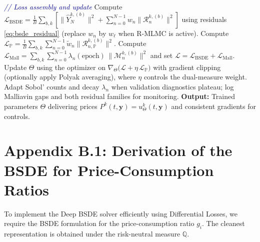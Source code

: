 \documentclass[11pt,letterpaper,oneside]{article}
\numberwithin{equation}{section}
\newcommand{\1}{\mathbf{1}}
\begin{document}
\begin{algorithm}[H]
\begin{algorithmic}[1]
    \State \textcolor{darkblue}{\textit{// Loss assembly and update}}
    \State Compute $\mathcal{L}_{\mathrm{BSDE}} = \frac{1}{B}\sum_{b,k}\left[\|\widehat{Y}_{N}^{k,(b)}\|^2 + \sum_{n=0}^{N-1} w_n \|\mathcal{R}_{n}^{k,(b)}\|^2\right]$ using residuals \eqref{eq:bsde_residual} (replace $w_n$ by $w_\ell$ when R-MLMC is active).
    \State Compute $\mathcal{L}_{\mathbb{P}} = \frac{1}{B}\sum_{b,k}\sum_{n=0}^{N-1} \tilde{w}_n \|\mathcal{R}_{n,\mathbb{P}}^{k,(b)}\|^2$.
    \State Compute $\mathcal{L}_{\mathrm{Mall}} = \sum_{b,k}\sum_{n=0}^{N-1} \lambda_n(\mathrm{epoch})\,\|\mathcal{M}_{n}^{k,(b)}\|^2$ and set $\mathcal{L} = \mathcal{L}_{\mathrm{BSDE}} + \mathcal{L}_{\mathrm{Mall}}$.
    \State Update $\Theta$ using the optimizer on $\nabla_{\Theta}\big(\mathcal{L} + \eta\,\mathcal{L}_{\mathbb{P}}\big)$ with gradient clipping (optionally apply Polyak averaging), where $\eta$ controls the dual-measure weight.
    \State Adapt Sobol' counts and decay $\lambda_n$ when validation diagnostics plateau; log Malliavin gaps and both residual families for monitoring.
  \EndFor
  \State \textbf{Output:} Trained parameters $\Theta$ delivering prices $P^{k}(t,\bm{y}) = u_{\Theta}^{k}(t,\bm{y})$ and consistent gradients for controls.
  \end{algorithmic}
\end{algorithm}

\section{Appendix B.1: Derivation of the BSDE for Price-Consumption Ratios}\label{app:bsde_derivation_g}

To implement the Deep BSDE solver efficiently using Differential Losses, we require the BSDE formulation for the price-consumption ratio $g_i$. The cleanest representation is obtained under the risk-neutral measure $\mathbb{Q}$.
\end{document}
